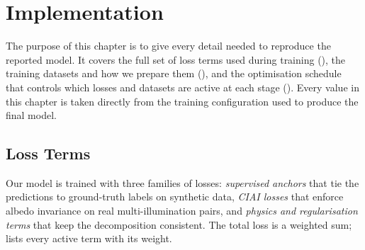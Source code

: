 \chapter{Implementation}
\label{ch:implementation}

The purpose of this chapter is to give every detail needed to reproduce the reported model.
It covers the full set of loss terms used during training
(), the training datasets and how we prepare them
(), and the optimisation schedule that controls which losses
and datasets are active at each stage ().
Every value in this chapter is taken directly from the training configuration
used to produce the final model.


\section{Loss Terms}
\label{sec:losses}

Our model is trained with three families of losses: \emph{supervised anchors}
that tie the predictions to ground-truth labels on synthetic data, \emph{CIAI
losses} that enforce albedo invariance on real multi-illumination pairs, and
\emph{physics and regularisation terms} that keep the decomposition consistent.
The total loss is a weighted sum;  lists every active term
with its weight.

